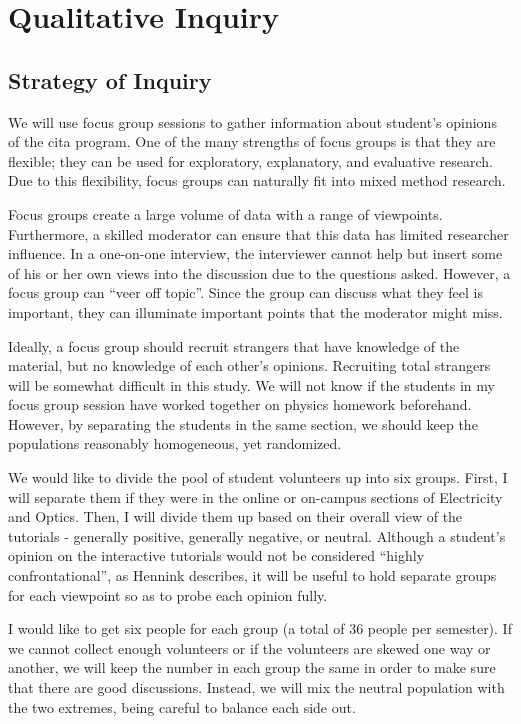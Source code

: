 \section{Qualitative Inquiry}

\subsection{Strategy of Inquiry}

We will use focus group sessions to gather information about student's opinions of the \gls{cita} program. One of the many strengths of focus groups is that they are flexible; they can be used for exploratory, explanatory, and evaluative research. Due to this flexibility, focus groups can naturally fit into mixed method research.

Focus groups create a large volume of data with a range of viewpoints. Furthermore, a skilled moderator can ensure that this data has limited researcher influence. In a one-on-one interview, the interviewer cannot help but insert some of his or her own views into the discussion due to the questions asked. However, a focus group can “veer off topic”. Since the group can discuss what they feel is important, they can illuminate important points that the moderator might miss.

Ideally, a focus group should recruit strangers that have knowledge of the material, but no knowledge of each other's opinions. Recruiting total strangers will be somewhat difficult in this study. We will not know if the students in my focus group session have worked together on physics homework beforehand. However, by separating the students in the same section, we should keep the populations reasonably homogeneous, yet randomized.

We would like to divide the pool of student volunteers up into six groups. First, I will separate them if they were in the online or on-campus sections of Electricity and Optics. Then, I will divide them up based on their overall view of the tutorials - generally positive, generally negative, or neutral. Although a student’s opinion on the interactive tutorials would not be considered “highly confrontational”, as Hennink describes, it will be useful to hold separate groups for each viewpoint so as to probe each opinion fully.

I would like to get six people for each group (a total of 36 people per semester). If we cannot collect enough volunteers or if the volunteers are skewed one way or another, we will keep the number in each group the same in order to make sure that there are good discussions. Instead, we will mix the neutral population with the two extremes, being careful to balance each side out.

